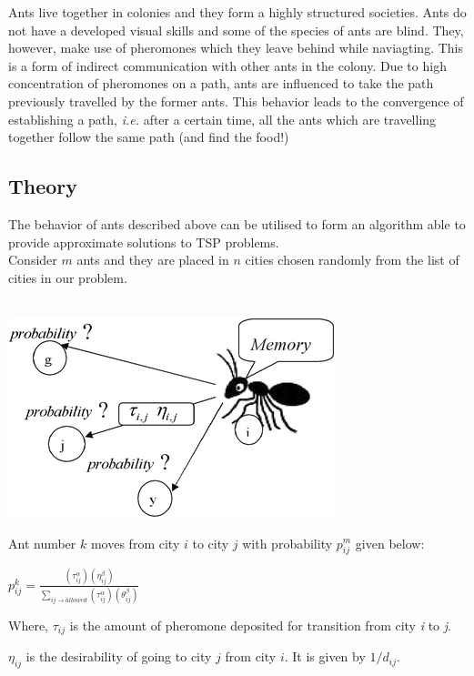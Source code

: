 \documentclass[11pt, english]{article}
\begin{document}
Ants live together in colonies and they form a highly structured societies. Ants do not have a developed visual skills and some of the species of ants are blind. They, however, make use of pheromones which they leave behind while naviagting. This is a form of indirect communication with other ants in the colony. Due to high concentration of pheromones on a path, ants are influenced to take the path previously travelled by the former ants. This behavior leads to the convergence of establishing a path, \emph{i.e.} after a certain time, all the ants which are travelling together follow the same path (and find the food!)
 
\subsection{Theory}

The behavior of ants described above can be utilised to form an algorithm able to provide approximate solutions to TSP problems.\\

\noindent
Consider $m$ ants and they are placed in $n$ cities chosen randomly from the list of cities in our problem.\\
\\
\begin{center}
\includegraphics[scale=0.5]{ant.png}
\end{center}

\noindent
Ant number $k$ moves from city $i$ to city $j$ with probability $p_{ij}^m$ given below:

\begin{center}
$p_{ij}^k = \frac{{(\tau_{ij}^\alpha)(\eta_{ij}^\beta)}}{\sum_{ij \rightarrow allowed}{(\tau_{ij}^\alpha)(\theta_{ij}^\beta)}}$
\end{center}
\noindent
Where, $\tau_{ij}$ is the amount of pheromone deposited for transition from city \emph{i} to \emph{j}.

\tab  $\eta _{ij}$ is the desirability of going to city ${j}$ from city ${i}$. It is given by ${1/d_{ij}}$.
\end{document}
